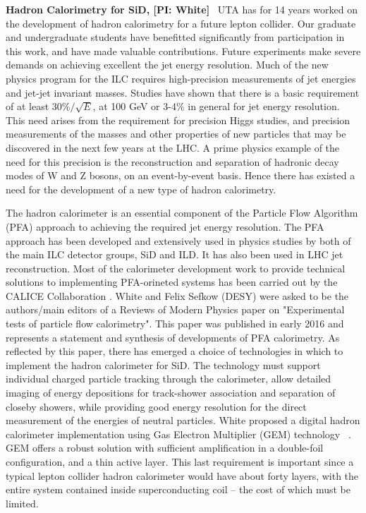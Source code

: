 
\textbf{Hadron Calorimetry for SiD, [PI: White]} \
UTA has for 14 years worked on the development of hadron calorimetry for a future lepton collider.
Our graduate and undergraduate students have benefitted significantly from participation in this work,
and have made valuable contributions.
Future experiments make severe demands on achieving excellent the jet energy resolution.
Much of the new physics program for the ILC requires high-precision measurements of jet
energies and jet-jet invariant masses.  Studies have shown that there is a basic requirement of at least $30\%/\sqrt{E}$,
at 100 GeV or 3-4\% in general for jet energy resolution. 
This need arises from the requirement for precision Higgs studies, and precision measurements
of the masses and other properties of new particles that may be discovered in the next few years at the LHC.
A prime physics example of the need for this precision is the reconstruction and 
separation of hadronic decay modes of W and Z bosons, on an event-by-event basis. 
Hence there has existed a need for the development of a new type of hadron calorimetry.

The hadron calorimeter is an essential component of the Particle Flow Algorithm (PFA) approach to achieving the required
jet energy resolution. The PFA approach has been developed and extensively used in physics studies by both of the 
main ILC detector groups, SiD and ILD. It has also been used in LHC jet reconstruction. Most of the calorimeter 
development work to provide technical solutions to implementing PFA-orineted systems has been carried out by the 
CALICE Collaboration \cite{CALICE}. White and Felix Sefkow (DESY) were 
asked to be the authors/main editors of a Reviews of Modern Physics paper on "Experimental tests of particle flow calorimetry".
This paper was published \cite{RMPCALICE} in early 2016 and represents a statement and synthesis of developments of PFA calorimetry.
As reflected by this paper, there has emerged a choice of technologies in which to implement the hadron calorimeter for SiD.
The technology must support individual charged particle tracking through the calorimeter, allow detailed imaging of energy 
depositions for track-shower association and separation of closeby showers, while providing good energy resolution for the
direct measurement of the energies of neutral particles.
White proposed \cite{GEMDHCAL} a digital hadron calorimeter implementation using Gas Electron Multiplier (GEM) technology ~\cite{Sauli}.
GEM offers a robust solution with sufficient amplification in a double-foil configuration, and a thin active layer. 
This last requirement is important since a typical lepton collider hadron calorimeter would have about forty layers, with the 
entire system contained inside superconducting coil -- the cost of which must be limited.

